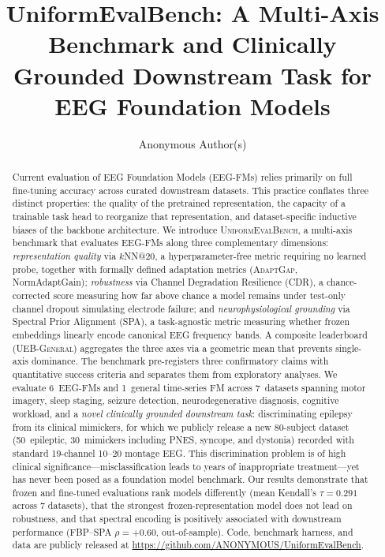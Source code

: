 \documentclass{article}
\title{UniformEvalBench: A Multi-Axis Benchmark and Clinically Grounded Downstream Task for EEG Foundation Models}
\author{%
  Anonymous Author(s)
}
\newcommand{\bench}{\textsc{UniformEvalBench}\xspace}
\newcommand{\cdr}{\textsc{CDR}\xspace}
\newcommand{\spa}{\textsc{SPA}\xspace}
\newcommand{\adaptgap}{\textsc{AdaptGap}\xspace}
\newcommand{\uebgen}{\textsc{UEB-General}\xspace}
\newcommand{\codeurl}{\url{https://github.com/ANONYMOUS/UniformEvalBench}}
\begin{document}
\maketitle

\begin{abstract}
Current evaluation of EEG Foundation Models (EEG-FMs) relies primarily on full fine-tuning accuracy across curated downstream datasets. This practice conflates three distinct properties: the quality of the pretrained representation, the capacity of a trainable task head to reorganize that representation, and dataset-specific inductive biases of the backbone architecture. We introduce \bench, a multi-axis benchmark that evaluates EEG-FMs along three complementary dimensions: \emph{representation quality} via $k$NN@20, a hyperparameter-free metric requiring no learned probe, together with formally defined adaptation metrics (\adaptgap, NormAdaptGain); \emph{robustness} via Channel Degradation Resilience (\cdr), a chance-corrected score measuring how far above chance a model remains under test-only channel dropout simulating electrode failure; and \emph{neurophysiological grounding} via Spectral Prior Alignment (\spa), a task-agnostic metric measuring whether frozen embeddings linearly encode canonical EEG frequency bands. A composite leaderboard (\uebgen) aggregates the three axes via a geometric mean that prevents single-axis dominance. The benchmark pre-registers three confirmatory claims with quantitative success criteria and separates them from exploratory analyses. We evaluate 6~EEG-FMs and 1~general time-series FM across 7~datasets spanning motor imagery, sleep staging, seizure detection, neurodegenerative diagnosis, cognitive workload, and a \emph{novel clinically grounded downstream task}: discriminating epilepsy from its clinical mimickers, for which we publicly release a new 80-subject dataset (50~epileptic, 30~mimickers including PNES, syncope, and dystonia) recorded with standard 19-channel 10--20 montage EEG. This discrimination problem is of high clinical significance---misclassification leads to years of inappropriate treatment---yet has never been posed as a foundation model benchmark. Our results demonstrate that frozen and fine-tuned evaluations rank models differently (mean Kendall's $\tau = 0.291$ across 7 datasets), that the strongest frozen-representation model does not lead on robustness, and that spectral encoding is positively associated with downstream performance (FBP--SPA $\rho = +0.60$, out-of-sample). Code, benchmark harness, and data are publicly released at \codeurl.
\end{abstract}
\end{document}
